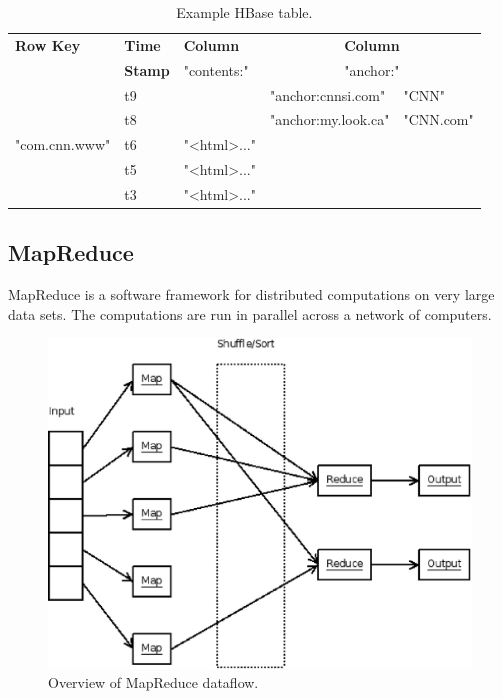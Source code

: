 \begin{table}[h]
    \begin{center}
        \begin{tabular}{|l|l|l|l|l|}
        \hline
        \small \bf Row Key & \small \bf Time & \small \bf Column &
        \multicolumn{2}{|c|}{\small \bf Column} \\
         & \small \bf Stamp & \small "contents:" &
        \multicolumn{2}{|c|}{\small "anchor:"} \\
        \hline
         & t9 & & \small "anchor:cnnsi.com" & "CNN" \\
         & t8 & & \small "anchor:my.look.ca" & "CNN.com" \\
        "com.cnn.www" & t6 & \small "{\textless}html\textgreater..." & & \\
         & t5 & \small "{\textless}html\textgreater..." & & \\
         & t3 & \small "{\textless}html\textgreater..." & & \\
        \hline
        \end{tabular}
        \caption{Example HBase table.}
    \end{center}
\end{table}


\subsection{MapReduce}

MapReduce is a software framework for distributed computations on very large
data sets. The computations are run in parallel across a network of computers.

\vspace{12pt}

\begin{figure}[h]
    \begin{center}
        \includegraphics[scale=0.50]{map-reduce.eps}
        \caption{Overview of MapReduce dataflow.}
    \end{center}
\end{figure}

